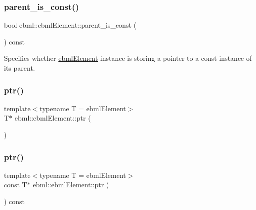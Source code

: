 \subsubsection{\texorpdfstring{parent\+\_\+is\+\_\+const()}{parent\_is\_const()}}
{\footnotesize\ttfamily bool ebml\+::ebml\+Element\+::parent\+\_\+is\+\_\+const (\begin{DoxyParamCaption}{ }\end{DoxyParamCaption}) const}

Specifies whether \mbox{\hyperlink{classebml_1_1ebmlElement}{ebml\+Element}} instance is storing a pointer to a const instance of its parent. \mbox{\label{classebml_1_1ebmlElement_a2229659406e42a5d5e9204b5e10451c7}} 
\subsubsection{\texorpdfstring{ptr()}{ptr()}\hspace{0.1cm}{\footnotesize\ttfamily [1/2]}}
{\footnotesize\ttfamily template$<$typename T  = ebml\+Element$>$ \\
T$\ast$ ebml\+::ebml\+Element\+::ptr (\begin{DoxyParamCaption}{ }\end{DoxyParamCaption})\hspace{0.3cm}{\ttfamily [inline]}}

\mbox{\label{classebml_1_1ebmlElement_a657258ef3296239556ed387c6a8d9672}} 
\subsubsection{\texorpdfstring{ptr()}{ptr()}\hspace{0.1cm}{\footnotesize\ttfamily [2/2]}}
{\footnotesize\ttfamily template$<$typename T  = ebml\+Element$>$ \\
const T$\ast$ ebml\+::ebml\+Element\+::ptr (\begin{DoxyParamCaption}{ }\end{DoxyParamCaption}) const\hspace{0.3cm}{\ttfamily [inline]}}

\mbox{\label{classebml_1_1ebmlElement_a77865a71f4bab782817ec82e88fb5198}} 
